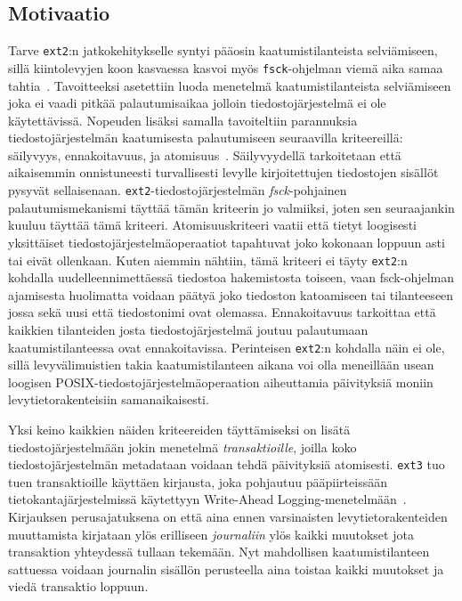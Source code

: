 \subsection{Motivaatio}

Tarve \texttt{ext2}:n jatkokehitykselle syntyi pääosin kaatumistilanteista selviämiseen,
sillä kiintolevyjen koon kasvaessa kasvoi myös \texttt{fsck}-ohjelman viemä aika samaa tahtia~\cite{Ext2Journal}.
Tavoitteeksi asetettiin luoda menetelmä kaatumistilanteista selviämiseen joka ei vaadi pitkää palautumisaikaa jolloin tiedostojärjestelmä ei ole käytettävissä.
Nopeuden lisäksi samalla tavoiteltiin parannuksia tiedostojärjestelmän kaatumisesta palautumiseen seuraavilla kriteereillä: säilyvyys, ennakoitavuus, ja atomisuus~\cite{Ext2Journal}.
Säilyvyydellä tarkoitetaan että aikaisemmin onnistuneesti turvallisesti levylle kirjoitettujen tiedostojen sisällöt pysyvät sellaisenaan.
\texttt{ext2}-tiedostojärjestelmän \emph{fsck}-pohjainen palautumismekanismi täyttää tämän kriteerin jo valmiiksi,
joten sen seuraajankin kuuluu täyttää tämä kriteeri.
Atomisuuskriteeri vaatii että tietyt loogisesti yksittäiset tiedostojärjestelmäoperaatiot tapahtuvat
joko kokonaan loppuun asti tai eivät ollenkaan.
Kuten aiemmin nähtiin, tämä kriteeri ei täyty \texttt{ext2}:n kohdalla uudelleennimettäessä tiedostoa hakemistosta toiseen,
vaan fsck-ohjelman ajamisesta huolimatta voidaan päätyä joko tiedoston katoamiseen tai tilanteeseen jossa sekä uusi että tiedostonimi ovat olemassa.
Ennakoitavuus tarkoittaa että kaikkien tilanteiden josta tiedostojärjestelmä joutuu palautumaan kaatumistilanteessa ovat ennakoitavissa.
Perinteisen \texttt{ext2}:n kohdalla näin ei ole,
sillä levyvälimuistien takia kaatumistilanteen aikana voi olla meneillään usean loogisen POSIX-tiedostojärjestelmäoperaation aiheuttamia päivityksiä moniin levytietorakenteisiin samanaikaisesti.

Yksi keino kaikkien näiden kriteereiden täyttämiseksi on lisätä tiedostojärjestelmään jokin menetelmä \emph{transaktioille}, joilla koko tiedostojärjestelmän metadataan voidaan tehdä päivityksiä atomisesti.
\texttt{ext3} tuo tuen transaktioille käyttäen kirjausta, joka pohjautuu pääpiirteissään tietokantajärjestelmissä käytettyyn Write-Ahead Logging-menetelmään~\cite{AriesWal}.
Kirjauksen perusajatuksena on että aina ennen varsinaisten levytietorakenteiden muuttamista kirjataan ylös erilliseen \emph{journaliin} ylös kaikki muutokset jota transaktion yhteydessä tullaan tekemään.
Nyt mahdollisen kaatumistilanteen sattuessa voidaan journalin sisällön perusteella aina toistaa kaikki muutokset ja viedä transaktio loppuun.

